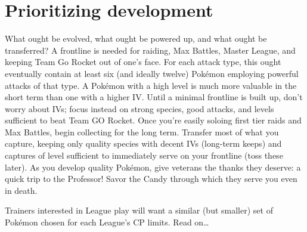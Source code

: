 \section{Prioritizing development}
\label{sec:developmentpriority}
What ought be evolved, what ought be powered up, and what ought be transferred?
A frontline is needed for raiding, Max Battles, Master League, and keeping Team Go Rocket out of one's face.
For each attack type, this ought eventually contain at least six (and ideally twelve) Pokémon
  employing powerful attacks of that type.
A Pokémon with a high level is much more valuable in the short term than one with a higher IV.
Until a minimal frontline is built up, don't worry about IVs; focus instead on strong species,
  good attacks, and levels sufficient to beat Team GO Rocket.
Once you're easily soloing first tier raids and Max Battles, begin collecting for the long term.
Transfer most of what you capture, keeping only quality species with decent IVs (long-term keeps)
  and captures of level sufficient to immediately serve on your frontline (toss these later).
As you develop quality Pokémon, give veterans the thanks they deserve: a quick trip to the Professor!
Savor the Candy through which they serve you even in death.

Trainers interested in League play will want a similar (but smaller) set of Pokémon chosen for each League's CP limits.
Read on\ldots
